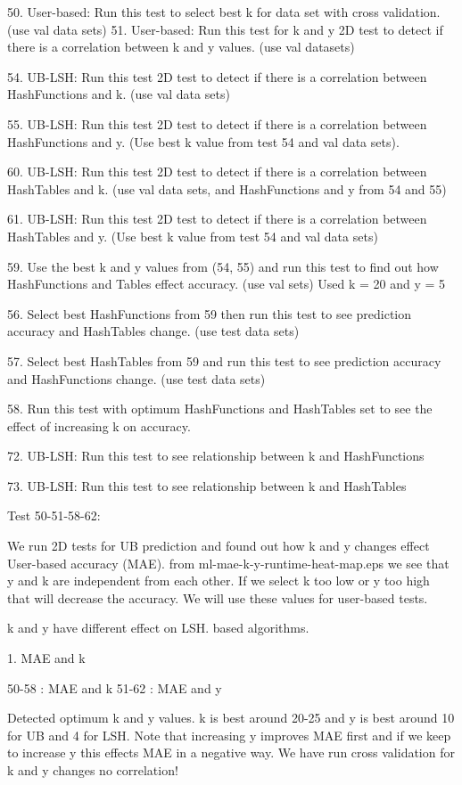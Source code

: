 50. User-based: Run  this test to select best k for data set with cross validation. (use val data sets)
51. User-based: Run this test for k and y 2D test to detect if there is a correlation between k and y values. (use val datasets)

54. UB-LSH: Run this test 2D test to detect if there is a correlation between HashFunctions and k. (use val data sets)

55. UB-LSH: Run this test 2D test to detect if there is a correlation between HashFunctions and y. (Use best k value from test 54 and val data sets).

60. UB-LSH: Run this test 2D test to detect if there is a correlation between HashTables and k. (use val data sets, and HashFunctions and y from 54 and 55)

61. UB-LSH: Run this test 2D test to detect if there is a correlation between HashTables and y. (Use best k value from test 54 and val data sets)

59. Use the best k and y values from (54, 55) and run this test to find out how HashFunctions and Tables effect accuracy. (use val sets) Used k = 20 and y = 5

56. Select best HashFunctions from 59 then run this test to see prediction accuracy and HashTables change. (use test data sets)

57. Select best  HashTables from 59 and run this test to see prediction accuracy and HashFunctions change. (use test data sets)

58. Run this test with optimum HashFunctions and HashTables set to see the effect of increasing k on accuracy.

72. UB-LSH: Run this test to see relationship between k and HashFunctions

73. UB-LSH: Run this test to see relationship between k and HashTables


Test 50-51-58-62:

We run 2D tests for UB prediction and found out how k and y changes effect User-based accuracy (MAE).
from ml-mae-k-y-runtime-heat-map.eps we see that y and k are independent from each other. If we select
k too low or y too high that will decrease the accuracy. We will use these values for user-based tests.


k and y have different effect on LSH. based algorithms.

1. MAE and k

50-58 : MAE and k
51-62 : MAE and y

Detected optimum k and y values. k is best around 20-25 and y is best around 10 for UB and 4 for LSH.
Note that increasing y improves MAE first and if we keep to increase y this effects MAE in a negative way.
We have run cross validation for k and y changes no correlation!



